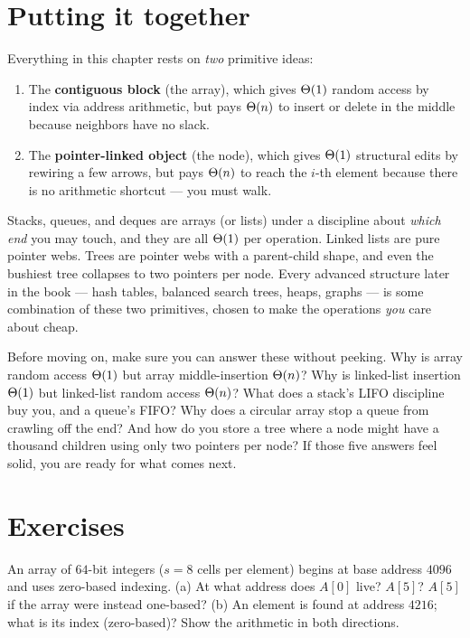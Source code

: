 \section{Putting it together}
\label{ch10:summary}

Everything in this chapter rests on \emph{two} primitive ideas:

\begin{enumerate}
  \item The \textbf{contiguous block} (the array), which gives $\Theta(1)$ random access by index via address arithmetic, but pays $\Theta(n)$ to insert or delete in the middle because neighbors have no slack.
  \item The \textbf{pointer-linked object} (the node), which gives $\Theta(1)$ structural edits by rewiring a few arrows, but pays $\Theta(n)$ to reach the $i$-th element because there is no arithmetic shortcut --- you must walk.
\end{enumerate}

Stacks, queues, and deques are arrays (or lists) under a discipline about \emph{which end} you may touch, and they are all $\Theta(1)$ per operation. Linked lists are pure pointer webs. Trees are pointer webs with a parent-child shape, and even the bushiest tree collapses to two pointers per node. Every advanced structure later in the book --- hash tables, balanced search trees, heaps, graphs --- is some combination of these two primitives, chosen to make the operations \emph{you} care about cheap.

\begin{recoverybox}
Before moving on, make sure you can answer these without peeking. Why is array random access $\Theta(1)$ but array middle-insertion $\Theta(n)$? Why is linked-list insertion $\Theta(1)$ but linked-list random access $\Theta(n)$? What does a stack's LIFO discipline buy you, and a queue's FIFO? Why does a circular array stop a queue from crawling off the end? And how do you store a tree where a node might have a thousand children using only two pointers per node? If those five answers feel solid, you are ready for what comes next.
\end{recoverybox}

\section*{Exercises}

\begin{exercise}
\label{ch10:ex-address}
An array of $64$-bit integers ($s = 8$ cells per element) begins at base address $4096$ and uses zero-based indexing. (a) At what address does $A[0]$ live? $A[5]$? $A[5]$ if the array were instead one-based? (b) An element is found at address $4216$; what is its index (zero-based)? Show the arithmetic in both directions.
\end{exercise}

